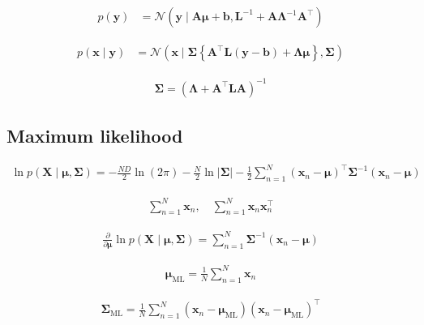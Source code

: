 \documentclass{article}
\begin{document}
\begin{align*}
p(\mathbf{y}) & = \mathcal{N}\left(\mathbf{y} \mid \mathbf{A} \boldsymbol{\mu} + \mathbf{b}, \mathbf{L}^{-1} + \mathbf{A} \boldsymbol{\Lambda}^{-1} \mathbf{A}^{\top}\right)
\tag{3.99}
\end{align*}

\begin{align*}
p(\mathbf{x} \mid \mathbf{y}) & = \mathcal{N}\left(\mathbf{x} \mid \boldsymbol{\Sigma} \left\{\mathbf{A}^{\top} \mathbf{L} (\mathbf{y} - \mathbf{b}) + \boldsymbol{\Lambda} \boldsymbol{\mu}\right\}, \boldsymbol{\Sigma}\right)
\tag{3.100}
\end{align*}

\begin{align*}
\boldsymbol{\Sigma} = \left(\boldsymbol{\Lambda} + \mathbf{A}^{\top} \mathbf{L} \mathbf{A}\right)^{-1}
\tag{3.101}
\end{align*}

\subsection{Maximum likelihood}

\begin{align*}
\ln p(\mathbf{X} \mid \boldsymbol{\mu}, \boldsymbol{\Sigma}) = -\frac{N D}{2} \ln (2 \pi) - \frac{N}{2} \ln |\boldsymbol{\Sigma}| - \frac{1}{2} \sum_{n=1}^{N}\left(\mathbf{x}_{n} - \boldsymbol{\mu}\right)^{\top} \boldsymbol{\Sigma}^{-1}\left(\mathbf{x}_{n} - \boldsymbol{\mu}\right)
\tag{3.102}
\end{align*}

\begin{align*}
\sum_{n=1}^{N} \mathbf{x}_{n}, \quad \sum_{n=1}^{N} \mathbf{x}_{n} \mathbf{x}_{n}^{\top}
\tag{3.103}
\end{align*}

\begin{align*}
\frac{\partial}{\partial \boldsymbol{\mu}} \ln p(\mathbf{X} \mid \boldsymbol{\mu}, \boldsymbol{\Sigma}) = \sum_{n=1}^{N} \boldsymbol{\Sigma}^{-1}\left(\mathbf{x}_{n} - \boldsymbol{\mu}\right)
\tag{3.104}
\end{align*}

\begin{align*}
\boldsymbol{\mu}_{\mathrm{ML}} = \frac{1}{N} \sum_{n=1}^{N} \mathbf{x}_{n}
\tag{3.105}
\end{align*}

\begin{align*}
\boldsymbol{\Sigma}_{\mathrm{ML}} = \frac{1}{N} \sum_{n=1}^{N}\left(\mathbf{x}_{n} - \boldsymbol{\mu}_{\mathrm{ML}}\right)\left(\mathbf{x}_{n} - \boldsymbol{\mu}_{\mathrm{ML}}\right)^{\top}
\tag{3.106}
\end{align*}
\end{document}
